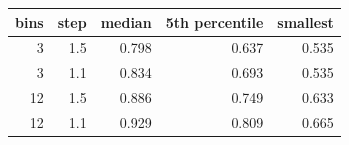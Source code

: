 \begin{tabular}{rrrrr}
\toprule
bins & step & median & 5th percentile & smallest \\
\midrule
3 & 1.5 & 0.798 & 0.637 & 0.535 \\
3 & 1.1 & 0.834 & 0.693 & 0.535 \\
12 & 1.5 & 0.886 & 0.749 & 0.633 \\
12 & 1.1 & 0.929 & 0.809 & 0.665 \\
\bottomrule
\end{tabular}

